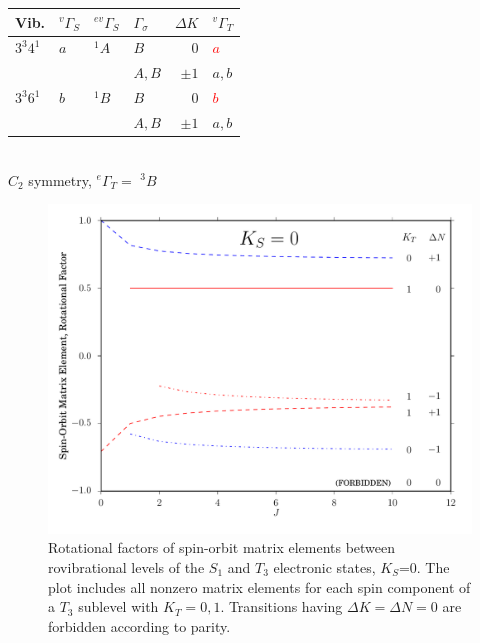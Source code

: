 \documentclass[12pt]{mitthesis}
\begin{document}
\begin{table}
  \centering

  \begin{tabular}{llllrl}
    Vib.
    & $^{v}\Gamma_S$ & $^{ev}\Gamma_S$ & $\Gamma_\sigma$ & $\Delta K$ & $^{v}\Gamma_T$ \\
    \toprule

    $3^3 4^1$ 
    & $a$ & $^{1}A$ & $B$ & $0$ & \textcolor{red}{$a$} \\
    & & & $A, B$ & $\pm1$ & $a, b$ \\[10pt]

    $3^3 6^1$ 
    & $b$ & $^{1}B$ & $B$ & $0$ & \textcolor{red}{$b$} \\
    & & & $A, B$ & $\pm1$ & $a, b$ \\

  \end{tabular}\\[5mm]

  $C_{2}$ symmetry, $^{e}\Gamma_T =$ $^{3}B$
\end{table}

\begin{figure}
  \caption{Rotational factors of spin-orbit matrix elements between
    rovibrational levels of the $S_1$ and $T_3$ electronic states,
    $K_S$=0.  The plot includes all nonzero matrix elements for each
    spin component of a $T_3$ sublevel with $K_T=0,1$.  Transitions
    having $\Delta K = \Delta N = 0$ are forbidden according to
    parity.}
  \centering
  \includegraphics[width=6in]{rotational-factors-k0.pdf}
\end{figure}
\end{document}
